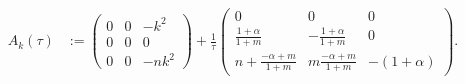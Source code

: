 \documentclass[a4paper,11pt]{article}
\theoremstyle{remark}
\begin{document}
\begin{equation} 
\begin{aligned}
 A_k(\tau)&:=\begin{pmatrix}
   0 & 0 & -k^2\\
   0 & 0 & 0\\
   0 & 0 & -nk^2
  \end{pmatrix} 
  + \frac{1}{\tau}
  \begin{pmatrix}
   0 & 0 & 0\\
   \tfrac{1+\alpha}{1+m} & -\tfrac{1+\alpha}{1+m} & 0\\
   n+ \tfrac{-\alpha+m}{1+m} & m\tfrac{-\alpha+m}{1+m}& -(1+\alpha)
  \end{pmatrix}.  
\end{aligned}
\end{equation}
\end{document}
